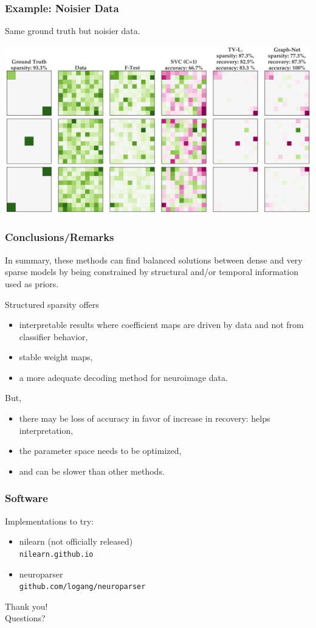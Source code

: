 \documentclass[11pt]{beamer}
\begin{document}
\begin{frame}[t]
  \frametitle{Example: Noisier Data}
  Same ground truth but noisier data.
  \begin{center}
    \includegraphics[scale=0.25]{figures/weights_sparse_synthetic_data_1.39_cbc.png} 
  \end{center}
\end{frame}
\begin{frame}[t,shrink]
  \frametitle{Conclusions/Remarks}
  In summary, these methods can find balanced solutions between dense and very
  sparse models by being constrained by structural and/or temporal information used as
  priors.

  Structured sparsity offers
  \begin{itemize}
  \item interpretable results where coefficient maps are driven by data and
    not from classifier behavior,
  \item stable weight maps,
  \item a more adequate decoding method for neuroimage data.
  \end{itemize}

  But,
  \begin{itemize}
  \item there may be loss of accuracy in favor of increase in recovery: helps
    interpretation,
  \item the parameter space needs to be optimized,
  \item and can be slower than other methods.
  \end{itemize}
\end{frame}
\begin{frame}
  \frametitle{Software}
  Implementations to try:
  \begin{itemize}
  \item nilearn (not officially released) \\
\texttt{nilearn.github.io}

\item neuroparser \\
\texttt{github.com/logang/neuroparser}
  \end{itemize}
\end{frame}
\begin{frame}[standout]
    Thank you! \\
    Questions?
\end{frame}
\end{document}

